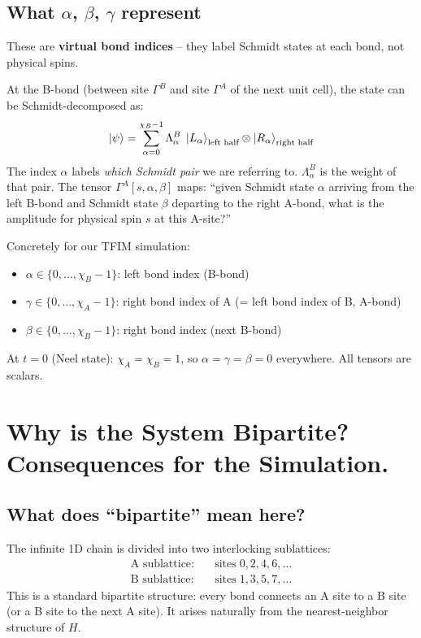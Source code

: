 \documentclass[11pt, a4paper]{article}
\begin{document}
\subsection{What $\alpha$, $\beta$, $\gamma$ represent}

These are \textbf{virtual bond indices} -- they label Schmidt states at each bond, not physical spins.

At the B-bond (between site $\Gamma^B$ and site $\Gamma^A$ of the next unit cell), the state can be Schmidt-decomposed as:
\begin{equation}
  \ket{\psi} = \sum_{\alpha=0}^{\chi_B - 1} \Lambda^B_\alpha \; \ket{L_\alpha}_{\text{left half}} \otimes \ket{R_\alpha}_{\text{right half}}
\end{equation}
The index $\alpha$ labels \emph{which Schmidt pair} we are referring to. $\Lambda^B_\alpha$ is the weight of that pair. The tensor $\Gamma^A[s, \alpha, \beta]$ maps: ``given Schmidt state $\alpha$ arriving from the left B-bond and Schmidt state $\beta$ departing to the right A-bond, what is the amplitude for physical spin $s$ at this A-site?''

Concretely for our TFIM simulation:
\begin{itemize}
  \item $\alpha \in \{0, \ldots, \chi_B - 1\}$: left bond index (B-bond)
  \item $\gamma \in \{0, \ldots, \chi_A - 1\}$: right bond index of A (= left bond index of B, A-bond)
  \item $\beta \in \{0, \ldots, \chi_B - 1\}$: right bond index (next B-bond)
\end{itemize}
At $t = 0$ (Neel state): $\chi_A = \chi_B = 1$, so $\alpha = \gamma = \beta = 0$ everywhere. All tensors are scalars.

\section{Why is the System Bipartite? Consequences for the Simulation.}
\label{sec:bipartite}

\subsection{What does ``bipartite'' mean here?}

The infinite 1D chain is divided into two interlocking sublattices:
\begin{align*}
  \text{A sublattice:} \quad &\text{sites} \; 0, 2, 4, 6, \ldots \\
  \text{B sublattice:} \quad &\text{sites} \; 1, 3, 5, 7, \ldots
\end{align*}
This is a standard bipartite structure: every bond connects an A site to a B site (or a B site to the next A site). It arises naturally from the nearest-neighbor structure of $H$.
\end{document}
